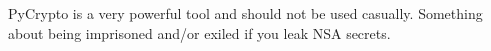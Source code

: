\begin{warn}
PyCrypto is a very powerful tool and should not be used casually.
Something about being imprisoned and/or exiled if you leak NSA secrets.
\end{warn}


\begin{comment}
\begin{problem}[Group Project]
Split into several groups of at least three individuals.
Each group member should generate a private and public keypair using PyCrypto.
Share your public keys with everyone in the group.

You might find it useful to transmit your messages as strings.
Here are two functions that will read and write specially formatted strings for your messages.
\begin{lstlisting}
def print_msg(m_encrypted):
    #print the encrypted message as a specially formatted string
    out = ("----BEGIN MESSAGE----",
           m_encrypted[0],
           "----END MESSAGE----",
           "----BEGIN SIGNATURE----",
           m_encrypted[1],
           "----END SIGNATURE----")
    return '\n'.join(out)

def read_msg(m_string):
    d1 = m_string.find('----BEGIN MESSAGE----') + 21
    d2 = m_string.find('----END MESSAGE----', d1)
    
    d3 = m_string.find('----BEGIN SIGNATURE----', d2) + 23
    d4 = m_string.find('----END SIGNATURE----', d3)
    message  = m_string[d1:d2]
    sign = m_string[d3:d4]
    return message.strip(), sign.strip()
\end{lstlisting}

\begin{enumerate}
\item Encrypt and sign a message for someone in the group and send it to the entire group.
Attach the sender's name to the encrypted message (a claim that the message came from a particular sender).
In this exercise we will verify that the actual origin of the message is indeed the claimed origin.
Each group member should do the following:
\begin{enumerate}
\item Decrypt and verify the message addressed for you.
\item Attempt to decrypt and verify message addressed for someone else in the group.
\item Report the message and verified signature.
\end{enumerate}


\end{comment}
